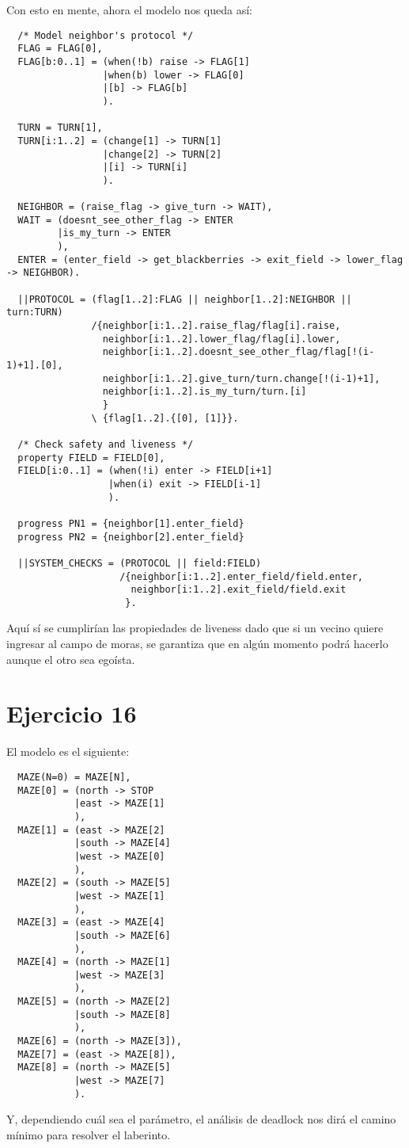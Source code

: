 \documentclass{article}
\begin{document}
Con esto en mente, ahora el modelo nos queda así:
\begin{verbatim}
  /* Model neighbor's protocol */ 
  FLAG = FLAG[0],
  FLAG[b:0..1] = (when(!b) raise -> FLAG[1]
                 |when(b) lower -> FLAG[0]
                 |[b] -> FLAG[b]
                 ).
  
  TURN = TURN[1],
  TURN[i:1..2] = (change[1] -> TURN[1]
                 |change[2] -> TURN[2]
                 |[i] -> TURN[i]
                 ).

  NEIGHBOR = (raise_flag -> give_turn -> WAIT),
  WAIT = (doesnt_see_other_flag -> ENTER 
         |is_my_turn -> ENTER
         ),
  ENTER = (enter_field -> get_blackberries -> exit_field -> lower_flag -> NEIGHBOR).

  ||PROTOCOL = (flag[1..2]:FLAG || neighbor[1..2]:NEIGHBOR || turn:TURN)
               /{neighbor[i:1..2].raise_flag/flag[i].raise, 
                 neighbor[i:1..2].lower_flag/flag[i].lower,
                 neighbor[i:1..2].doesnt_see_other_flag/flag[!(i-1)+1].[0],
                 neighbor[i:1..2].give_turn/turn.change[!(i-1)+1],
                 neighbor[i:1..2].is_my_turn/turn.[i]
                 }
               \ {flag[1..2].{[0], [1]}}.

  /* Check safety and liveness */ 
  property FIELD = FIELD[0],
  FIELD[i:0..1] = (when(!i) enter -> FIELD[i+1]
                  |when(i) exit -> FIELD[i-1]
                  ).

  progress PN1 = {neighbor[1].enter_field}
  progress PN2 = {neighbor[2].enter_field}

  ||SYSTEM_CHECKS = (PROTOCOL || field:FIELD)
                    /{neighbor[i:1..2].enter_field/field.enter,
                      neighbor[i:1..2].exit_field/field.exit 
                     }. 
\end{verbatim}

Aquí sí se cumplirían las propiedades de liveness dado que si un vecino quiere ingresar al campo de moras, se garantiza que en algún momento podrá hacerlo aunque el otro sea egoísta.

\section*{Ejercicio 16}
El modelo es el siguiente:
\begin{verbatim}
  MAZE(N=0) = MAZE[N],
  MAZE[0] = (north -> STOP 
            |east -> MAZE[1]
            ),
  MAZE[1] = (east -> MAZE[2]
            |south -> MAZE[4]
            |west -> MAZE[0]
            ),
  MAZE[2] = (south -> MAZE[5]
            |west -> MAZE[1]
            ),
  MAZE[3] = (east -> MAZE[4]
            |south -> MAZE[6]
            ),
  MAZE[4] = (north -> MAZE[1]
            |west -> MAZE[3]
            ),
  MAZE[5] = (north -> MAZE[2]
            |south -> MAZE[8]
            ),
  MAZE[6] = (north -> MAZE[3]),
  MAZE[7] = (east -> MAZE[8]),
  MAZE[8] = (north -> MAZE[5]
            |west -> MAZE[7]
            ).
\end{verbatim}

Y, dependiendo cuál sea el parámetro, el análisis de deadlock nos dirá el camino mínimo para resolver el laberinto.
\end{document}
